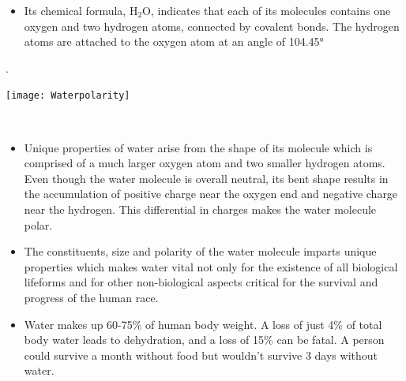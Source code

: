 \begin{minipage}{.7\textwidth} 
\begin{itemize}
\item Its chemical formula, H$_2$O, indicates that each of its molecules contains one oxygen and two hydrogen atoms, connected by covalent bonds. The hydrogen atoms are attached to the oxygen atom at an angle of 104.45\si{\degree}
\end{itemize}.
    \end{minipage}%
        \begin{minipage}{0.3\textwidth}
        \centering
        \texttt{[image: Waterpolarity]}
    \end{minipage}\\
\vspace{0.5cm}
\begin{itemize}
\item Unique properties of water arise from the shape of its molecule which is comprised of a much larger oxygen atom and two smaller hydrogen atoms.  Even though the water molecule is overall neutral, its bent shape results in the accumulation of positive charge near the oxygen end and negative charge near the hydrogen.  This differential in charges makes the water molecule polar. 

\item The constituents, size and polarity of the water molecule imparts unique properties which makes water vital not only for the existence of all biological lifeforms and for other non-biological aspects critical for the survival and progress of the human race.

\item Water makes up 60-75\% of human body weight. A loss of just 4\% of total body water leads to dehydration, and a loss of 15\% can be fatal. A person could survive a month without food but wouldn’t survive 3 days without water.\\
\end{itemize}

